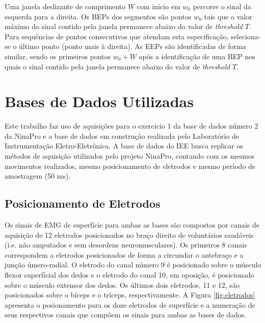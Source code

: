 

Uma janela deslizante de comprimento $W$ com início em $w_0$ percorre o sinal da esquerda para a direita. Os BEPs dos segmentos são pontos $w_0$ tais que o valor máximo do sinal contido pela janela permanece abaixo do valor de \emph{threshold} $T$. Para sequências de pontos consecutivos que atendam esta especificação, seleciona-se o último ponto (ponto mais à direita). As EEPs são identificadas de forma similar, sendo os primeiros pontos $w_0 + W$ após a identificação de uma BEP nos quais o sinal contido pela janela permanece abaixo do valor de \emph{threshold} $T$.




		\section{Bases de Dados Utilizadas}
Este trabalho faz uso de aquisições para o exercício 1 da base de dados número 2 da NinaPro \cite{Gijsberts2014} e a base de dados em construção realizada pelo Laboratório de Instrumentação Eletro-Eletrônica. A base de dados do IEE busca replicar os métodos de aquisição utilizados pelo projeto NinaPro, contando com os mesmos movimentos realizados, mesmo posicionamento de eletrodos e mesmo período de amostragem (50 ms).

			\subsection{Posicionamento de Eletrodos}
Os sinais de EMG de superfície para ambas as bases são compostos por canais de aquisição de 12 eletrodos posicionados no braço direito de voluntários saudáveis (i.e. não amputados e sem desordens neuromusculares). Os primeiros 8 canais correspondem a eletrodos posicionados de forma a circundar o antebraço e a junção úmero-radial. O eletrodo do canal número 9 é posicionado sobre o músculo flexor superfícial dos dedos e o eletrodo do canal 10, em oposição, é posicionado sobre o músculo extensor dos dedos. Os últimos dois eletrodos, 11 e 12, são posicionados sobre o bíceps e o tríceps, respectivamente. A Figura \ref{fig:eletrodos} apresenta o posionamento para os doze eletrodos de superfície e a numeração de seus respectivos canais que compõem os sinais para ambas as bases de dados.

